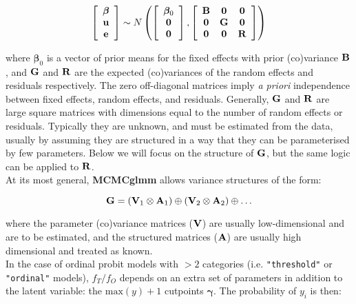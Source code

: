 \documentclass{article}
\begin{document}
\begin{equation}
\left[
\begin{array}{c}
{\bm \beta}\\
{\bf u}\\
{\bf e}
\end{array}
\right]
 \sim N\left(
\left[
\begin{array}{c}
{\bm \beta}_{0}\\
{\bf 0}\\
{\bf 0}\\
\end{array}
\right]
, 
\left[
\begin{array}{ccc}
{\bf B}&{\bf 0}&{\bf 0}\\
{\bf 0}&{\bf G}&{\bf 0}\\
{\bf 0}&{\bf 0}&{\bf R}\\
\end{array}
\right]
\right)
\label{V-Eq}
\end{equation}

where ${\bm \beta}_{0}$ is a vector of prior means for the fixed effects with prior (co)variance ${\bf B}$, and ${\bf G}$ and ${\bf R}$ are the expected (co)variances of the random effects and residuals respectively.  The zero off-diagonal matrices imply \emph{a priori} independence between fixed effects, random effects, and residuals.  Generally, ${\bf G}$ and ${\bf R}$ are large square matrices with dimensions equal to the number of random effects or residuals. Typically they are unknown, and must be estimated from the data, usually by assuming they are structured in a way that they can be parameterised by few parameters. Below we will focus on the structure of ${\bf G}$, but the same logic can be applied to ${\bf R}$.\\ 

At its most general, {\bf MCMCglmm} allows variance structures of the form:

\begin{equation}
{\bf G}= \left({\bf V}_{1}\otimes{\bf A}_{1}\right) \oplus \left({\bf V}_{2}\otimes{\bf A}_{2}\right) \oplus \ldots
\label{G3-Eq}
\end{equation}

where the parameter (co)variance matrices (${\bf V}$) are usually low-dimensional and are to be estimated, and the structured matrices (${\bf A}$) are usually high dimensional and treated as known.\\

In the case of ordinal probit models with $>2$ categories (i.e. \texttt{"threshold"} or \texttt{"ordinal"} models), $f_{T}/f_{O}$ depends on an extra set of parameters in addition to the latent variable: the $\textrm{max}(y)+1$ cutpoints ${\bm \gamma}$. The probability of $y_{i}$ is then: 
\end{document}
